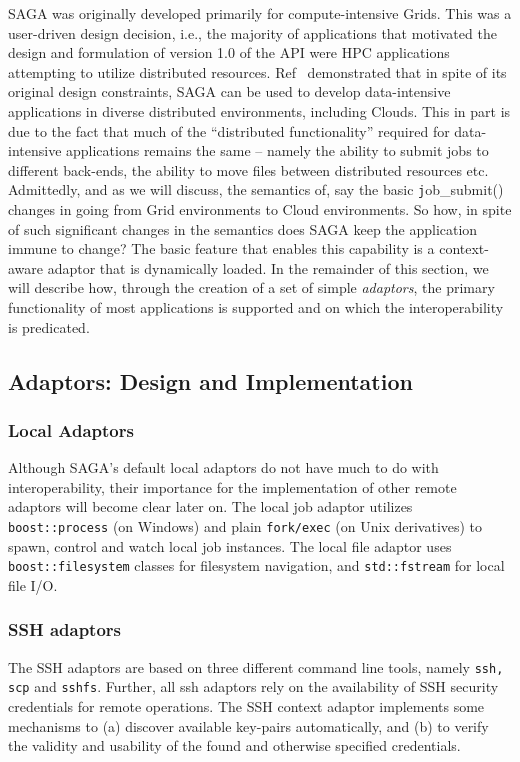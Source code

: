 \documentclass[conference,final]{IEEEtran}
\newcommand{\upup}{\vspace*{-0.6em}}
\newcommand{\T}[1]{\texttt{#1}}
\begin{document}
SAGA was originally developed primarily for compute-intensive
Grids. This was a user-driven design decision, i.e., the majority of
applications that motivated the design and formulation of version 1.0
of the API were HPC applications attempting to utilize distributed
resources.  Ref~\cite{saga_ccgrid09} demonstrated that in spite of its
original design constraints, SAGA can be used to develop
data-intensive applications in diverse distributed environments,
including Clouds.  This in part is due to the fact that much of the
``distributed functionality'' required for data-intensive applications
remains the same -- namely the ability to submit jobs to different
back-ends, the ability to move files between distributed resources
etc. Admittedly, and as we will discuss, the semantics of, say the
basic {\texttt job\_submit()} changes in going from Grid environments
to Cloud environments.  So how, in spite of such significant changes
in the semantics does SAGA keep the application immune to change? The
basic feature that enables this capability is a context-aware adaptor
that is dynamically loaded.  In the remainder of this section, we will
describe how, through the creation of a set of simple {\it adaptors},
the primary functionality of most applications is supported and on
which the interoperability is predicated.

\upup
\subsection{Adaptors: Design and Implementation}

\subsubsection{Local Adaptors}
Although SAGA's default local adaptors do not have much to do with
interoperability, their importance for the implementation of other
remote adaptors will become clear later on.  The local job adaptor
utilizes \T{boost::process} (on Windows) and plain \T{fork/exec} (on
Unix derivatives) to spawn, control and watch local job instances.  The
local file adaptor uses \T{boost::filesystem} classes for filesystem
navigation, and \T{std::fstream} for local file I/O. %

\subsubsection{SSH adaptors}
The SSH adaptors are based on three different command line tools,
namely {\texttt{ssh, scp}} and {\texttt{sshfs}}.  Further, all ssh
adaptors rely on the availability of SSH security credentials for
remote operations.  The SSH context adaptor implements some mechanisms
to (a) discover available key-pairs automatically, and (b) to verify
the validity and usability of the found and otherwise specified
credentials.
  
\end{document}
